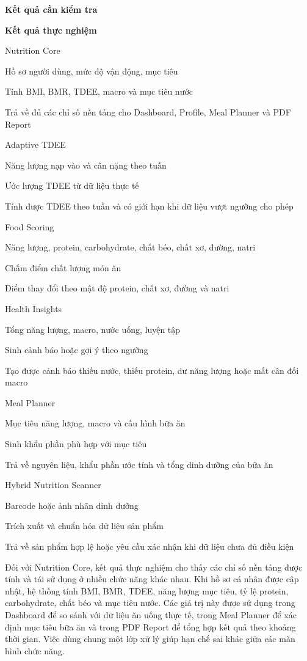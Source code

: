\documentclass[12pt, a4paper]{report}
\begin{document}
\textbf{Kết quả cần kiểm tra}

\textbf{Kết quả thực nghiệm}

Nutrition Core

Hồ sơ người dùng, mức độ vận động, mục tiêu

Tính BMI, BMR, TDEE, macro và mục tiêu nước

Trả về đủ các chỉ số nền tảng cho Dashboard, Profile, Meal Planner và PDF Report

Adaptive TDEE

Năng lượng nạp vào và cân nặng theo tuần

Ước lượng TDEE từ dữ liệu thực tế

Tính được TDEE theo tuần và có giới hạn khi dữ liệu vượt ngưỡng cho phép

Food Scoring

Năng lượng, protein, carbohydrate, chất béo, chất xơ, đường, natri

Chấm điểm chất lượng món ăn

Điểm thay đổi theo mật độ protein, chất xơ, đường và natri

Health Insights

Tổng năng lượng, macro, nước uống, luyện tập

Sinh cảnh báo hoặc gợi ý theo ngưỡng

Tạo được cảnh báo thiếu nước, thiếu protein, dư năng lượng hoặc mất cân đối macro

Meal Planner

Mục tiêu năng lượng, macro và cấu hình bữa ăn

Sinh khẩu phần phù hợp với mục tiêu

Trả về nguyên liệu, khẩu phần ước tính và tổng dinh dưỡng của bữa ăn

Hybrid Nutrition Scanner

Barcode hoặc ảnh nhãn dinh dưỡng

Trích xuất và chuẩn hóa dữ liệu sản phẩm

Trả về sản phẩm hợp lệ hoặc yêu cầu xác nhận khi dữ liệu chưa đủ điều kiện

Đối với Nutrition Core, kết quả thực nghiệm cho thấy các chỉ số nền tảng được tính và tái sử dụng ở nhiều chức năng khác nhau. Khi hồ sơ cá nhân được cập nhật, hệ thống tính BMI, BMR, TDEE, năng lượng mục tiêu, tỷ lệ protein, carbohydrate, chất béo và mục tiêu nước. Các giá trị này được sử dụng trong Dashboard để so sánh với dữ liệu ăn uống thực tế, trong Meal Planner để xác định mục tiêu bữa ăn và trong PDF Report để tổng hợp kết quả theo khoảng thời gian. Việc dùng chung một lớp xử lý giúp hạn chế sai khác giữa các màn hình chức năng.
\end{document}
